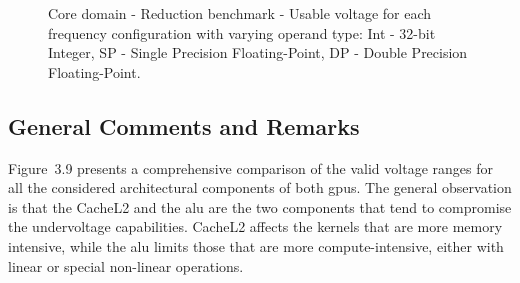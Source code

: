 
\begin{figure}[!htb]
    \centering
    \begin{subfigmatrix}{2}
      \label{fig:Reduction_guardband}
    \end{subfigmatrix}
    \caption{Core domain - Reduction benchmark - Usable voltage for each frequency configuration with varying operand type: Int - 32-bit Integer, SP - Single Precision Floating-Point, DP - Double Precision Floating-Point.}
\end{figure}


\subsection{General Comments and Remarks}


Figure~3.9 presents a comprehensive comparison of the valid voltage ranges for all the considered architectural components of both \acrshort{gpu}s. 
The general observation is that the CacheL2 and the \acrshort{alu} are the two components that tend to compromise the undervoltage capabilities. CacheL2 affects the kernels that are more memory intensive, while the \acrshort{alu} limits those that are more compute-intensive, either with linear or special non-linear operations. 


